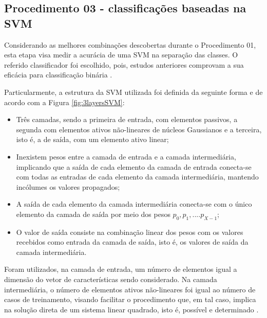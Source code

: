 		\subsection{Procedimento 03 - classificações baseadas na SVM}
		\label{chap:propApproach:sec:Experimento03}
		\par Considerando as melhores combinações descobertas durante o Procedimento 01, esta etapa visa medir a acurácia de uma SVM na separação das classes. O referido classificador foi escolhido, pois, estudos anteriores comprovam a sua eficácia para classificação binária \cite{bennett2000support}. 
		
		\par Particularmente, a estrutura da SVM utilizada foi definida da seguinte forma e de acordo com a Figura \ref{fig:3layersSVM}: 
		\begin{itemize}
			\item Três camadas, sendo a primeira de entrada, com elementos passivos, a segunda com elementos ativos não-lineares de núcleos Gaussianos e a terceira, isto é, a de saída, com um elemento ativo linear; 
			
			\item Inexistem pesos entre a camada de entrada e a camada intermediária, implicando que a saída de cada elemento da camada de entrada conecta-se com todas as entradas de cada elemento da camada intermediária, mantendo incólumes os valores propagados;

			\item A saída de cada elemento da camada intermediária conecta-se com o único elemento da camada de saída por meio dos pesos $p_0, p_1, .... p_{X-1}$;

			\item O valor de saída consiste na combinação linear dos pesos com os valores recebidos como entrada da camada de saída, isto é, os valores de saída da camada intermediária.
		\end{itemize}

		

		\par Foram utilizados, na camada de entrada, um número de elementos igual a dimensão do vetor de características sendo considerado. Na camada intermediária, o número de elementos ativos não-lineares foi igual ao número de casos de treinamento, visando facilitar o procedimento que, em tal caso, implica na solução direta de um sistema linear quadrado, isto é, possível e determinado \cite{poole2014linear}. 
		
